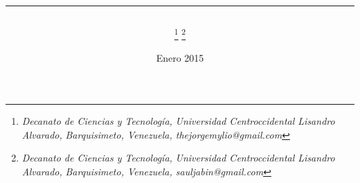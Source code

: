 \documentclass[11pt,twoside,A5]{article}
\begin{document}
\title{
\vspace{-1.1in}
\begin{flushleft}
{\normalsize \begin{center}
\end{center}}
\end{flushleft}
\hrule \vspace{0.5in}{ARQUITECTURA HÍBRIDA DE NAVEGACIÓN PARA ROBOT PIONEER PD3X} }

\author{ 
\footnote{  {\it\scriptsize  Decanato de Ciencias y Tecnolog\'ia,} 
{\it\scriptsize Universidad Centroccidental Lisandro Alvarado,}
{\it\scriptsize Barquisimeto, Venezuela, thejorgemylio@gmail.com}
}\hspace{1mm}{Jorge Parra}
 \hspace{3mm} 
\footnote{  {\it\scriptsize  Decanato de Ciencias y Tecnolog\'ia,} 
{\it\scriptsize Universidad Centroccidental Lisandro Alvarado,}
{\it\scriptsize Barquisimeto, Venezuela, sauljabin@gmail.com}
}\hspace{1mm}{ Saúl Piña} \\
}

\date{\small{Enero 2015}
}
\end{document}
